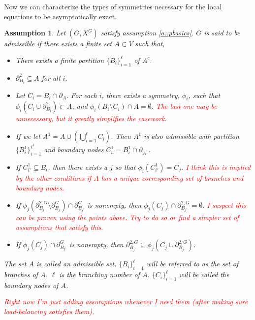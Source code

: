 \documentclass[12pt]{article}
\newcommand{\tr}{\textcolor{red}}
\newcommand{\ind}{\hspace{24pt}}
\newcommand{\neigh}[1]{\partial_{#1}}				%
\newcommand{\dneigh}[1]{\partial^2_{#1}}			%
\newcommand{\gneigh}[2]{\partial^{#1}_{#2}}			%
\newcommand{\dgneigh}[2]{\partial^{2,#1}_{#2}}		%
\newcommand{\indx}[1]{^{#1}}						%
\newcommand{\Xf}{X}									%
\newcommand{\gind}[1]{^{#1}}						%
\newcommand{\psize}{\ell}							%
\newtheorem{assu}[thms]{Assumption}
\begin{document}
Now we can characterize the types of symmetries necessary for the local equations to be asymptotically exact.

\begin{assu}
Let \((G,\Xf\gind{G})\) satisfy assumption \ref{a::pbasics}. \(G\) is said to be admissible if there exists a finite set \(A \subset V\) such that,

\begin{itemize}
\item There exists a finite partition \(\{B_i\}_{i=1}^\psize\) of \(A^c\).

\item \(\dneigh{B_i} \subseteq A\) for all \(i\).

\item Let \(C_i = B_i\cap\neigh{A}\). For each \(i\), there exists a symmetry, \(\phi_i\), such that \(\phi_i(C_i\cup \dneigh{B_i}) \subset A\), and \(\phi_i(B_i\setminus C_i)\cap A = \emptyset\). \tr{The last one may be unnecessary, but it greatly simplifies the casework.}

\item If we let \(A\indx{1} = A\cup \left(\bigcup_{i=1}^\psize C_i\right)\). Then \(A\indx{1}\) is also admissible with partition \(\{B\indx{1}_i\}_{i=1}^{\psize\indx{1}}\) and boundary nodes \(C\indx{1}_i = B\indx{1}_i\cap \neigh{A\indx{1}}\).

\item If \(C\indx{1}_{i'} \subseteq B_i\), then there exists a \(j\) so that \(\phi_i(C\indx{1}_{i'}) = C_j\). \tr{I think this is implied by the other conditions if \(A\) has a unique corresponding set of branches and boundary nodes.}

\item If \(\phi_j(\dgneigh{G}{B_j}\setminus\gneigh{G}{B_j})\cap\gneigh{G}{B_{j'}}\) is nonempty, then \(\phi_j(C_j)\cap\dgneigh{G}{B_{j'}} = \emptyset\). \tr{I suspect this can be proven using the points above. Try to do so or find a simpler set of assumptions that satisfy this.}

\item If \(\phi_j(C_j) \cap \gneigh{G}{B_{j'}}\) is nonempty, then \(\dgneigh{G}{B_{j'}} \subseteq \phi_j(C_j\cup\dgneigh{G}{B_j})\).
\end{itemize}

The set \(A\) is called an admissible set. \(\{B_i\}_{i=1}^\psize\) will be referred to as the set of branches of \(A\). \(\psize\) is the branching number of \(A\). \(\{C_i\}_{i=1}^\psize\) will be called the boundary nodes of \(A\).

\ind \tr{Right now I'm just adding assumptions whenever I need them (after making sure load-balancing satisfies them).}
\label{a::admissible}
\end{assu}
\end{document}
